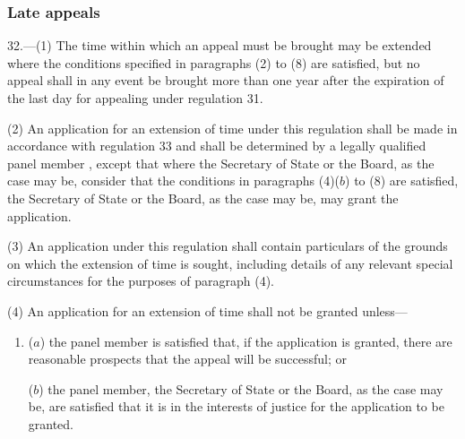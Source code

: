 \documentclass[12pt,a4paper]{article}
\begin{document}
\subsubsection[32. Late appeals]{Late appeals}

32.—(1) The time within which an appeal must be brought may be extended where the conditions specified in paragraphs (2) to (8) are satisfied, but no appeal shall in any event be brought more than one year after the expiration of the last day for appealing under regulation 31.

(2) An application for an extension of time under this regulation shall be made in accordance with regulation 33 and shall be determined by a legally qualified panel member%
, except that where the Secretary of State or the Board, as the case may be, consider that the conditions in paragraphs (4)($b$)  to (8) are satisfied, the Secretary of State or the Board, as the case may be, may grant the application.  %

(3) An application under this regulation shall contain particulars of the grounds on which the extension of time is sought, including details of any relevant special circumstances for the purposes of paragraph (4).

%

(4) An application for an extension of time shall not be granted unless—
\begin{enumerate}\item[]
($a$) the panel member is satisfied that, if the application is granted, there are reasonable prospects that the appeal will be successful; or

($b$) the panel member, the Secretary of State or the Board, as the case may be, are satisfied that it is in the interests of justice for the application to be granted.
\end{enumerate}
\end{document}
